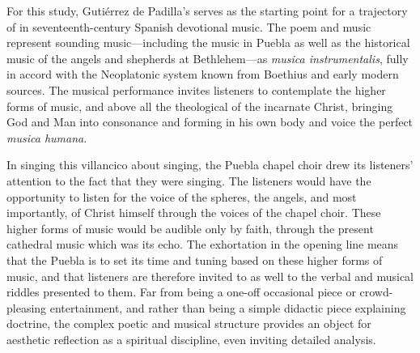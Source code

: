 For this study, Gutiérrez de Padilla's  serves as the starting point for a
trajectory of  in seventeenth-century Spanish
devotional music.
The poem and music represent sounding music---including the 
music in Puebla as well as the historical music of the angels and shepherds at
Bethlehem---as \emph{musica instrumentalis}, fully in accord with the
Neoplatonic system known from Boethius and early modern sources.
The musical performance invites listeners to contemplate the higher forms of
music, and above all the theological  of the incarnate Christ,
bringing God and Man into consonance and forming in his own body and voice the
perfect \emph{musica humana}.

In singing this villancico about singing, the Puebla chapel choir drew its
listeners' attention to the fact that they were singing.
The listeners would have the opportunity to listen for the voice of the spheres,
the angels, and most importantly, of Christ himself through the voices of the
chapel choir.
These higher forms of music would be audible only by faith, through the present
cathedral music which was its echo.
The exhortation in the opening line means that the Puebla 
is to set its time and tuning based on these higher forms of music, and that
listeners are therefore invited to  as well to the verbal
and musical riddles presented to them.
Far from being a one-off occasional piece or crowd-pleasing entertainment, and
rather than being a simple didactic piece explaining doctrine, the complex
poetic and musical structure provides an object for aesthetic reflection as a
spiritual discipline, even inviting detailed analysis.

